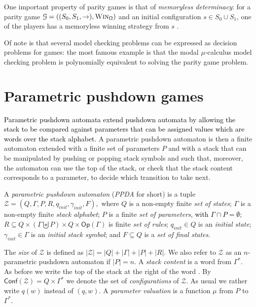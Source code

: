 \documentclass[a4paper,UKenglish,cleveref, autoref, thm-restate]{lipics-v2021}
\newcommand\mh[1]{\todo[inline,size=\scriptsize]{#1 - \textbf{Mathieu}}}
\newcommand{\Conf}{\mathsf{Conf}}
\newcommand{\Op}{\mathsf{Op}}
\newcommand{\win}{\textsc{Win}}
\begin{document}
One important property of parity games is that of {\em memoryless determinacy}: for a parity game
$\mathcal{G}= ((S_0,S_1,\rightarrow),\win_\Omega) $ and an initial configuration $s \in S_0 \cup S_1$, one of the players has a memoryless winning strategy from $s$ \cite{zielonka1998infinite}.

Of note is that several model checking problems %
can be expressed as decision problems for games: the most famous example is that the modal $\mu$-calculus model checking problem is polynomially equivalent to solving the parity game problem. 


\section{Parametric pushdown games}





\textcolor{black}{Parametric pushdown automata extend pushdown automata by allowing the stack to be compared against parameters that can be assigned values which are words over the stack alphabet.}
A parametric pushdown automaton is then a finite automaton extended with a finite set of parameters $P$  and with a stack that can be manipulated by pushing or popping stack symbols and such that, moreover, the automaton can use the top of the stack, or check that the stack content corresponds to a parameter,  to decide which transition to take next.\\

\par\noindent\ignorespacesafterend
A {\em parametric pushdown automaton} ({\em PPDA} for short) 
is a tuple $\mathcal{Z} = (Q, \Gamma, P, R, q_{init},\gamma_{init}, F),$ where
 $Q$ is a non-empty finite {\em set of  states};
 $\Gamma$ is a non-empty finite {\em  stack alphabet};
 $P$ is a finite {\em   set of parameters}, \textcolor{black}{with $\Gamma \cap P = \emptyset$};
  $R   \subseteq  Q  \times (\Gamma \biguplus P)  \times Q  \times \Op(\Gamma)$ is finite {\em  set of rules};
 $q_{init}\in Q$ is an {\em initial  state};
 $ \gamma_{init} \in \Gamma$ is an {\em initial stack symbol}; and
 $F\subseteq Q$ is a {\em set of final  states}.


The {\em size} of $\mathcal{Z}$ is defined as
$|\mathcal{Z}| = |Q| + |\Gamma| + |P| + |R| $.
We also refer to $\mathcal{Z}$ as an $n$-parametric pushdown automaton if $|P| = n$.
A {\em stack content} is a word from $ \Gamma^*$. 
As before we write the top
of the stack at the right of the word%
. 
By $\Conf(\mathcal{Z})=Q\times  \Gamma^*$ we denote the set of
{\em configurations} of $\mathcal{Z}$. As usual we rather write $q(w)$ instead of $(q, w)$.
A {\em parameter valuation} is a function $\mu$ from $P$ to $\Gamma^*$.
\end{document}
